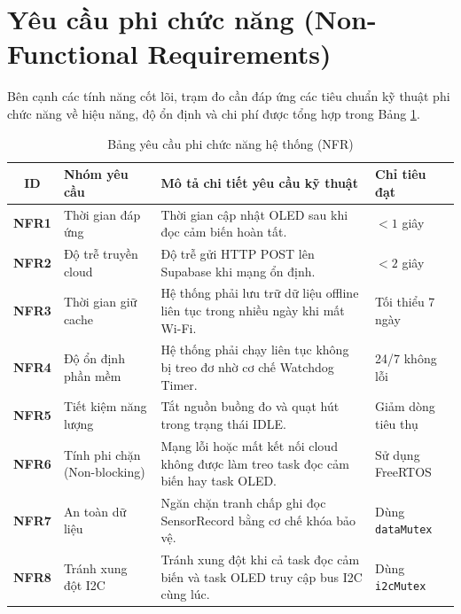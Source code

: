 \section{Yêu cầu phi chức năng (Non-Functional Requirements)}
Bên cạnh các tính năng cốt lõi, trạm đo cần đáp ứng các tiêu chuẩn kỹ thuật phi chức năng về hiệu năng, độ ổn định và chi phí được tổng hợp trong Bảng \ref{tab:nonfunctionalreqs}.

\begin{table}[H]
\centering
\caption{Bảng yêu cầu phi chức năng hệ thống (NFR)}
\label{tab:nonfunctionalreqs}
\small
\renewcommand{\arraystretch}{1.35}
\setlength{\tabcolsep}{5pt}

\begin{tabularx}{\textwidth}{|c|p{3.0cm}|X|p{2.6cm}|}
\hline
\textbf{ID} & \textbf{Nhóm yêu cầu} & \textbf{Mô tả chi tiết yêu cầu kỹ thuật} & \textbf{Chỉ tiêu đạt} \\
\hline

\textbf{NFR1} & Thời gian đáp ứng & 
Thời gian cập nhật OLED sau khi đọc cảm biến hoàn tất. 
& $< 1$ giây \\
\hline

\textbf{NFR2} & Độ trễ truyền cloud & 
Độ trễ gửi HTTP POST lên Supabase khi mạng ổn định. 
& $< 2$ giây \\
\hline

\textbf{NFR3} & Thời gian giữ cache & 
Hệ thống phải lưu trữ dữ liệu offline liên tục trong nhiều ngày khi mất Wi-Fi. 
& Tối thiểu 7 ngày \\
\hline

\textbf{NFR4} & Độ ổn định phần mềm & 
Hệ thống phải chạy liên tục không bị treo đơ nhờ cơ chế Watchdog Timer. 
& 24/7 không lỗi \\
\hline

\textbf{NFR5} & Tiết kiệm năng lượng & 
Tắt nguồn buồng đo và quạt hút trong trạng thái IDLE. 
& Giảm dòng tiêu thụ \\
\hline

\textbf{NFR6} & Tính phi chặn (Non-blocking) & 
Mạng lỗi hoặc mất kết nối cloud không được làm treo task đọc cảm biến hay task OLED. 
& Sử dụng FreeRTOS \\
\hline

\textbf{NFR7} & An toàn dữ liệu & 
Ngăn chặn tranh chấp ghi đọc SensorRecord bằng cơ chế khóa bảo vệ. 
& Dùng \texttt{dataMutex} \\
\hline

\textbf{NFR8} & Tránh xung đột I2C & 
Tránh xung đột khi cả task đọc cảm biến và task OLED truy cập bus I2C cùng lúc. 
& Dùng \texttt{i2cMutex} \\
\hline


\end{tabularx}
\end{table}
